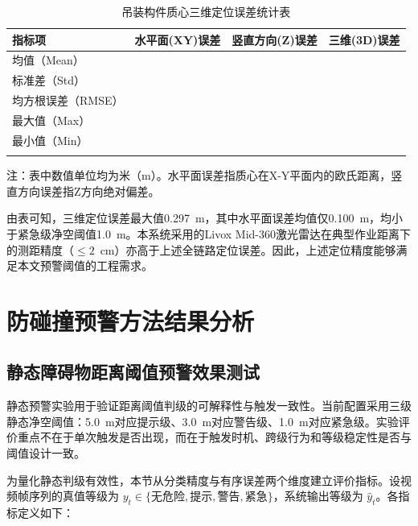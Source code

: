 \begin{table}[htbp]
\centering
\caption{吊装构件质心三维定位误差统计表}
\label{tab:ch6_centroid_error}
\begin{tabular*}{\textwidth}{@{\extracolsep{\fill}}>{\centering\arraybackslash}m{4.5cm}>{\centering\arraybackslash}m{3.0cm}>{\centering\arraybackslash}m{3.0cm}>{\centering\arraybackslash}m{3.0cm}}
\Xhline{1pt}
\textbf{指标项} & \textbf{水平面(XY)误差} & \textbf{竖直方向(Z)误差} & \textbf{三维(3D)误差} \\
\hline
均值（Mean） & 0.100 & 0.159 & 0.228 \\
标准差（Std） & 0.105 & 0.107 & 0.077 \\
均方根误差（RMSE） & 0.145 & 0.192 & 0.241 \\
最大值（Max） & 0.283 & 0.293 & 0.297 \\
最小值（Min） & 0.018 & 0.009 & 0.043 \\
\Xhline{1pt}
\end{tabular*}
\parbox{\textwidth}{\vspace{0.5em}\small\raggedright 注：表中数值单位均为米（m）。水平面误差指质心在X-Y平面内的欧氏距离，竖直方向误差指Z方向绝对偏差。}
\end{table}

由表可知，三维定位误差最大值0.297~m，其中水平面误差均值仅0.100~m，均小于紧急级净空阈值1.0~m。本系统采用的Livox Mid-360激光雷达在典型作业距离下的测距精度（$\leq 2$~cm）亦高于上述全链路定位误差。因此，上述定位精度能够满足本文预警阈值的工程需求。

\section{防碰撞预警方法结果分析}\label{sec_ch6_warning_validation}

\subsection{静态障碍物距离阈值预警效果测试}\label{subsec_ch6_static_warning}

静态预警实验用于验证距离阈值判级的可解释性与触发一致性。当前配置采用三级静态净空阈值：5.0~m对应提示级、3.0~m对应警告级、1.0~m对应紧急级。实验评价重点不在于单次触发是否出现，而在于触发时机、跨级行为和等级稳定性是否与阈值设计一致。

为量化静态判级有效性，本节从分类精度与有序误差两个维度建立评价指标。设视频帧序列的真值等级为 $y_t\in\{\text{无危险},\text{提示},\text{警告},\text{紧急}\}$，系统输出等级为 $\hat{y}_t$。各指标定义如下：

